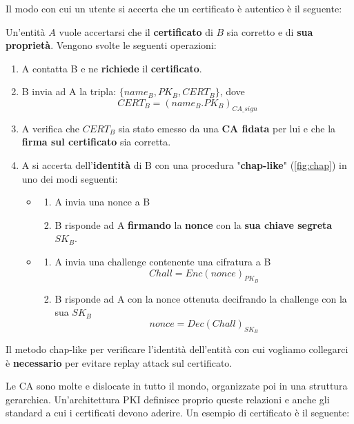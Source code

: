 Il modo con cui un utente si accerta che un certificato è autentico è il seguente:
\begin{definition}\label{def:certval}
Un'entità $A$ vuole accertarsi che il \textbf{certificato} di $B$ sia corretto e di \textbf{sua proprietà}. Vengono svolte le seguenti operazioni:
\begin{enumerate}
    \item A contatta B e ne \textbf{richiede} il \textbf{certificato}.
    \item B invia ad A la tripla: $\{name_B, PK_B, CERT_B\}$, dove \[CERT_B=(name_B. PK_B)_{CA\_sign}\]
    \item A verifica che $CERT_B$ sia stato emesso da una \textbf{CA fidata} per lui e che la \textbf{firma sul certificato} sia corretta.
    \item A si accerta dell'\textbf{identità} di B con una procedura "\textbf{chap-like}" (\cref{fig:chap}) in uno dei modi seguenti:
    \begin{itemize}
        \item \begin{enumerate}
        \item A invia una nonce a B
        \item B risponde ad A \textbf{firmando} la \textbf{nonce} con la \textbf{sua chiave segreta} $SK_B$.
    \end{enumerate}
    \item \begin{enumerate}
        \item A invia una challenge contenente una cifratura a B
        \[Chall=Enc(nonce)_{PK_B}\]
        \item B risponde ad A con la nonce ottenuta decifrando la challenge con la sua $SK_B$ 
        \[nonce = Dec(Chall)_{SK_B}\]
    \end{enumerate}
    \end{itemize}
\end{enumerate}
\end{definition}
\begin{remark}
Il metodo chap-like per verificare l'identità dell'entità con cui vogliamo collegarci è \textbf{necessario} per evitare replay attack sul certificato.
\end{remark}
Le CA sono molte e dislocate in tutto il mondo, organizzate poi in una struttura gerarchica. Un'architettura PKI definisce proprio queste relazioni e anche gli standard a cui i certificati devono aderire. Un esempio di certificato è il seguente:

